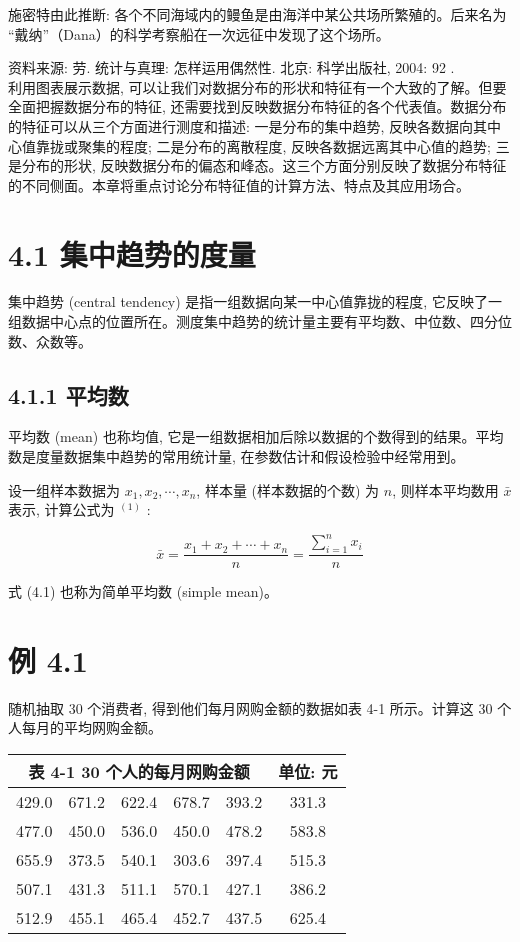\documentclass[10pt]{article}
\begin{document}
\begin{CJK*}{UTF8}{bsmi}
施密特由此推断: 各个不同海域内的鳗鱼是由海洋中某公共场所繁殖的。后来名为 “戴纳”（Dana）的科学考察船在一次远征中发现了这个场所。

资料来源: 劳. 统计与真理: 怎样运用偶然性. 北京: 科学出版社, 2004: 92 .\\
利用图表展示数据, 可以让我们对数据分布的形状和特征有一个大致的了解。但要全面把握数据分布的特征, 还需要找到反映数据分布特征的各个代表值。数据分布的特征可以从三个方面进行测度和描述: 一是分布的集中趋势, 反映各数据向其中心值靠拢或聚集的程度; 二是分布的离散程度, 反映各数据远离其中心值的趋势; 三是分布的形状, 反映数据分布的偏态和峰态。这三个方面分别反映了数据分布特征的不同侧面。本章将重点讨论分布特征值的计算方法、特点及其应用场合。

\section*{4.1 集中趋势的度量}
集中趋势 (central tendency) 是指一组数据向某一中心值靠拢的程度, 它反映了一组数据中心点的位置所在。测度集中趋势的统计量主要有平均数、中位数、四分位数、众数等。

\subsection*{4.1.1 平均数}
平均数 (mean) 也称均值, 它是一组数据相加后除以数据的个数得到的结果。平均数是度量数据集中趋势的常用统计量, 在参数估计和假设检验中经常用到。

设一组样本数据为 $x_{1}, x_{2}, \cdots, x_{n}$, 样本量 (样本数据的个数) 为 $n$, 则样本平均数用 $\bar{x}$ 表示, 计算公式为 ${ }^{(1)}$ :


\begin{equation*}
\bar{x}=\frac{x_{1}+x_{2}+\cdots+x_{n}}{n}=\frac{\sum_{i=1}^{n} x_{i}}{n} \tag{4.1}
\end{equation*}


式 (4.1) 也称为简单平均数 (simple mean)。

\section*{例 4.1}
随机抽取 30 个消费者, 得到他们每月网购金额的数据如表 4-1 所示。计算这 30 个人每月的平均网购金额。

\begin{center}
\begin{tabular}{cccccc}
\multicolumn{5}{c}{表 4-1 $\mathbf{3 0}$ 个人的每月网购金额} & 单位: 元 \\
\hline
429.0 & 671.2 & 622.4 & 678.7 & 393.2 & 331.3 \\
477.0 & 450.0 & 536.0 & 450.0 & 478.2 & 583.8 \\
655.9 & 373.5 & 540.1 & 303.6 & 397.4 & 515.3 \\
507.1 & 431.3 & 511.1 & 570.1 & 427.1 & 386.2 \\
512.9 & 455.1 & 465.4 & 452.7 & 437.5 & 625.4 \\
\hline
\end{tabular}
\end{center}


\end{CJK*}
\end{document}
